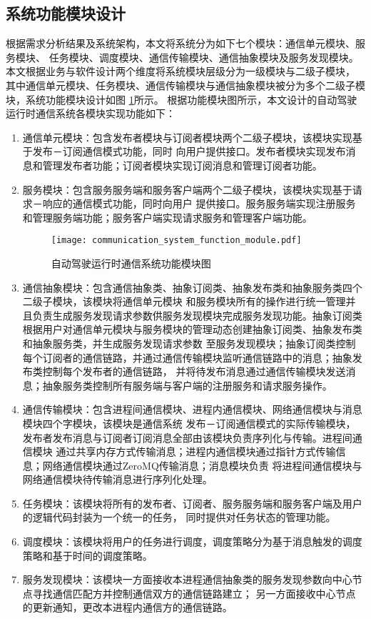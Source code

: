 \subsection{系统功能模块设计}
根据需求分析结果及系统架构，本文将系统分为如下七个模块：通信单元模块、服务模块、
任务模块、调度模块、通信传输模块、通信抽象模块及服务发现模块。本文根据业务与软件设计两个维度将系统模块层级分为一级模块与二级子模块，
其中通信单元模块、任务模块、通信传输模块与通信抽象模块被分为多个二级子模块，系统功能模块设计如图
\ref{communication_system_function_module}所示。
根据功能模块图所示，本文设计的自动驾驶运行时通信系统各模块实现功能如下：
\begin{enumerate}
  \item 通信单元模块：包含发布者模块与订阅者模块两个二级子模块，该模块实现基于发布－订阅通信模式功能，同时
  向用户提供接口。发布者模块实现发布消息和管理发布者功能；订阅者模块实现订阅消息和管理订阅者功能。
  \item 服务模块：包含服务服务端和服务客户端两个二级子模块，该模块实现基于请求－响应的通信模式功能，同时向用户
  提供接口。服务服务端实现注册服务和管理服务端功能；服务客户端实现请求服务和管理客户端功能。
  \begin{figure}[htb]
    \centering
    \texttt{[image: communication\_system\_function\_module.pdf]}
    \caption{自动驾驶运行时通信系统功能模块图}
    \label{communication_system_function_module}
  \end{figure}
  \item 通信抽象模块：包含通信抽象类、抽象订阅类、抽象发布类和抽象服务类四个二级子模块，该模块将通信单元模块
  和服务模块所有的操作进行统一管理并且负责生成服务发现请求参数供服务发现模块完成服务发现功能。抽象订阅类
  根据用户对通信单元模块与服务模块的管理动态创建抽象订阅类、抽象发布类和抽象服务类，并生成服务发现请求参数
  至服务发现模块；抽象订阅类控制每个订阅者的通信链路，并通过通信传输模块监听通信链路中的消息；抽象发布类控制每个发布者的通信链路，
  并将待发布消息通过通信传输模块发送消息；抽象服务类控制所有服务端与客户端的注册服务和请求服务操作。
  \item 通信传输模块：包含进程间通信模块、进程内通信模块、网络通信模块与消息模块四个字模块，该模块是通信系统
  发布－订阅通信模式的实际传输模块，发布者发布消息与订阅者订阅消息全部由该模块负责序列化与传输。进程间通信模块
  通过共享内存方式传输消息；进程内通信模块通过指针方式传输信息；网络通信模块通过ZeroMQ传输消息；消息模块负责
  将进程间通信模块与网络通信模块待传输消息进行序列化处理。
  \item 任务模块：该模块将所有的发布者、订阅者、服务服务端和服务客户端及用户的逻辑代码封装为一个统一的任务，
  同时提供对任务状态的管理功能。
  \item 调度模块：该模块将用户的任务进行调度，调度策略分为基于消息触发的调度策略和基于时间的调度策略。
  \item 服务发现模块：该模块一方面接收本进程通信抽象类的服务发现参数向中心节点寻找通信匹配方并控制通信双方的通信链路建立；
  另一方面接收中心节点的更新通知，更改本进程内通信方的通信链路。
\end{enumerate}


